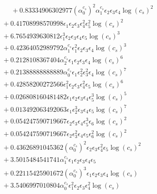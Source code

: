 \documentclass[10pt]{article}
\begin{document}
\begin{align*}
\phantom{F_{s,7}} &\phantom{={}}{}  + 0.83334906302977 \left(\alpha_{0}^{c_s}\right)^{2} \alpha_{1}^{c_s} \epsilon_{2} \epsilon_{3} \epsilon_{4} \log{\left(c_{s} \right)}^{2} \\
&{}  + 0.41708998570998 \epsilon_{1} \epsilon_{2} \epsilon_{3} \epsilon_{4}^{2} \epsilon_{5}^{2} \log{\left(c_{s} \right)}^{2} \\
&{}  + 6.7654939630812 \epsilon_{1}^{3} \epsilon_{2} \epsilon_{3} \epsilon_{4} \epsilon_{5} \log{\left(c_{s} \right)}^{3} \\
&{}  + 0.42364052989792 \alpha_{1}^{c_s} \epsilon_{1}^{2} \epsilon_{2} \epsilon_{3} \epsilon_{4} \log{\left(c_{s} \right)}^{3} \\
&{}  + 0.2128108367404 \alpha_{2}^{c_s} \epsilon_{1} \epsilon_{2} \epsilon_{3} \epsilon_{4} \log{\left(c_{s} \right)}^{6} \\
&{}  + 0.21388888888889 \alpha_{0}^{c_s} \epsilon_{1} \epsilon_{2}^{2} \epsilon_{3}^{2} \epsilon_{4} \log{\left(c_{s} \right)}^{7} \\
&{}  + 0.42858200272566 \epsilon_{1}^{2} \epsilon_{2} \epsilon_{3} \epsilon_{4}^{2} \epsilon_{5} \log{\left(c_{s} \right)}^{6} \\
&{}  + 0.026808160481482 \epsilon_{1} \epsilon_{2} \epsilon_{3} \epsilon_{4} \epsilon_{5}^{3} \log{\left(c_{s} \right)}^{5} \\
&{}  + 0.013492063492063 \epsilon_{1} \epsilon_{2}^{3} \epsilon_{3} \epsilon_{4} \epsilon_{5} \log{\left(c_{s} \right)}^{7} \\
&{}  + 0.054247590719667 \epsilon_{2} \epsilon_{3} \epsilon_{4} \epsilon_{5}^{3} \epsilon_{6} \log{\left(c_{s} \right)}^{2} \\
&{}  + 0.054247590719667 \epsilon_{2} \epsilon_{3}^{2} \epsilon_{4} \epsilon_{5} \epsilon_{6}^{2} \log{\left(c_{s} \right)}^{2} \\
&{}  + 0.43626891045362 \left(\alpha_{0}^{c_s}\right)^{2} \epsilon_{2} \epsilon_{3} \epsilon_{4}^{2} \epsilon_{5} \log{\left(c_{s} \right)}^{2} \\
&{}  + 3.5015484541741 \alpha_{1}^{c_s} \epsilon_{1} \epsilon_{2} \epsilon_{3} \epsilon_{4} \epsilon_{5} \\
&{}  + 0.22115425901672 \left(\alpha_{0}^{c_s}\right)^{3} \epsilon_{1} \epsilon_{2} \epsilon_{3} \epsilon_{4} \log{\left(c_{s} \right)} \\
&{}  + 3.5406997010804 \alpha_{0}^{c_s} \epsilon_{1}^{2} \epsilon_{2} \epsilon_{3} \epsilon_{4}^{2} \log{\left(c_{s} \right)} \\

\end{align*}
\end{document}

